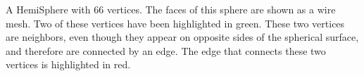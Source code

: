 \label{fig:hemiSphere} A HemiSphere with 66 vertices. The faces of this sphere are shown as a wire mesh. Two of these vertices have been highlighted in green. These two vertices are neighbors, even though they appear on opposite sides of the spherical surface, and therefore are connected by an edge. The edge that connects these two vertices is highlighted in red.